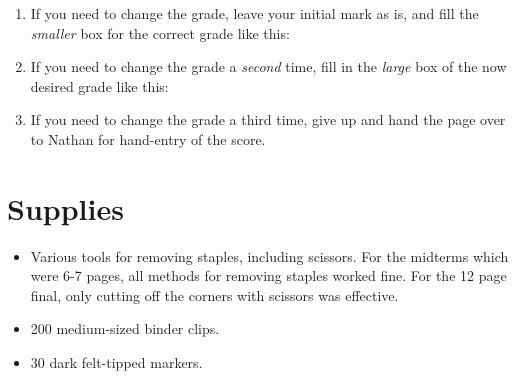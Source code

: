 \documentclass[12pt]{article}
\begin{document}
\begin{enumerate}
\begin{enumerate}
  \item 
    \begin{minipage}[t]{10cm}
      If you need to change the grade, leave your initial mark as is,
      and fill the \emph{smaller} box for the correct grade like this:
    \end{minipage} \quad
    
  \item
    \begin{minipage}[t]{10cm}
       If you need to change the grade a \emph{second} time, fill in the
       \emph{large} box of the now desired grade like this:
    \end{minipage} \quad

  \item If you need to change the grade a third time, give up and
    hand the page over to Nathan for hand-entry of the score. 

\end{enumerate}

\end{enumerate}


\section{Supplies}

\begin{itemize}

\item Various tools for removing staples, including scissors.  For the
  midterms which were 6-7 pages, all methods for removing staples
  worked fine.  For the 12 page final, only cutting off the corners
  with scissors was effective.

\item 200 medium-sized binder clips.

\item 30 dark felt-tipped markers.

\end{itemize}
\end{document}
